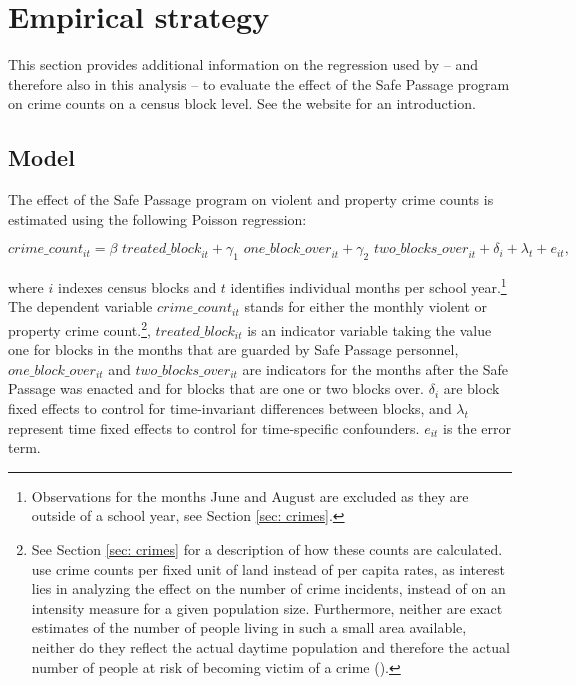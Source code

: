 \documentclass[]{article}
\begin{document}
\section{Empirical strategy}
\label{sec: empstrategy}
This section provides additional information on the regression used by \cite{mcmillen2017} -- and therefore also in this analysis -- to evaluate the effect of the Safe Passage program on crime counts on a census block level. See the website for an introduction.

\subsection{Model}


The effect of the Safe Passage program on violent and property crime counts is estimated using the following Poisson regression:

\begin{equation}
crime\_count_{it} = \beta \textit{ treated\_block}_{it} + \gamma_1 \textit{ one\_block\_over}_{it} + \gamma_2 \textit{ two\_blocks\_over}_{it} + \delta_i + \lambda_t + e_{it} \label{eq: poisson},
\end{equation}

where $i$ indexes census blocks and $t$ identifies individual months per school year.\footnote{Observations for the months June and August are excluded as they are outside of a school year, see Section \ref{sec: crimes}.} The dependent variable $crime\_count_{it}$ stands for either the monthly violent or  property crime count.\footnote{See Section \ref{sec: crimes} for a description of how these counts are calculated. \cite{mcmillen2017} use crime counts per fixed unit of land instead of per capita rates, as interest lies in analyzing the effect on the number of crime incidents, instead of on an intensity measure for a given population size. Furthermore,  neither are exact estimates of the number of people living in such a small area available, neither do they reflect the actual daytime population and therefore the actual number of people at risk of becoming victim of a crime (\citealt{grogger2002effects}).}, $treated\_block_{it}$ is an indicator variable taking the value one for blocks in the months that are guarded by Safe Passage personnel, $one\_block\_over_{it}$ and $two\_blocks\_over_{it}$ are indicators for the months after the Safe Passage was enacted and for blocks that are one or two blocks over. $\delta_i$ are block fixed effects to control for time-invariant differences between blocks, and $\lambda_t$  represent time fixed effects to control for time-specific confounders. $e_{it}$ is the error term.\\
\end{document}

